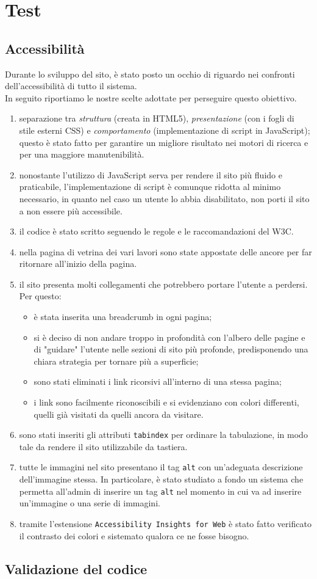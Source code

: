\section{Test}
\subsection{Accessibilità}
Durante lo sviluppo del sito, è stato posto un occhio di riguardo nei confronti dell'accessibilità di tutto il sistema.\\In seguito riportiamo le nostre scelte adottate per perseguire questo obiettivo.
\begin{enumerate}
	\item separazione tra \textit{struttura} (creata in HTML5), \textit{presentazione} (con i fogli di stile esterni CSS) e \textit{comportamento} (implementazione di script in JavaScript); \\questo è stato fatto per garantire un migliore risultato nei motori di ricerca e per una maggiore manutenibilità.
	
	\item nonostante l'utilizzo di JavaScript serva per rendere il sito più fluido e praticabile, l'implementazione di script è comunque ridotta al minimo necessario, in quanto nel caso un utente lo abbia disabilitato, non porti il sito a non essere più accessibile.
	\item il codice è stato scritto seguendo le regole e le raccomandazioni del W3C.
	\item nella pagina di vetrina dei vari lavori sono state appostate delle ancore per far ritornare all'inizio della pagina.
	\item il sito presenta molti collegamenti che potrebbero portare l'utente a perdersi. Per questo: 
	\begin{itemize}
	\item è stata inserita una breadcrumb in ogni pagina;
	\item si è deciso di non andare troppo in profondità con l'albero delle pagine e di "guidare" l'utente nelle sezioni di sito più profonde, predisponendo una chiara strategia per tornare più a superficie;
	\item sono stati eliminati i link ricorsivi all'interno di una stessa pagina;
	\item i link sono facilmente riconoscibili e si evidenziano con colori differenti, quelli già visitati da quelli ancora da visitare.
	\end{itemize}	
	\item sono stati inseriti gli attributi \texttt{tabindex} per ordinare la tabulazione, in modo tale da rendere il sito utilizzabile da tastiera.
	\item tutte le immagini nel sito presentano il tag \texttt{alt} con un'adeguata descrizione dell'immagine stessa. In particolare, è stato studiato a fondo un sistema che permetta all'admin di inserire un tag \texttt{alt} nel momento in cui va ad inserire un'immagine o una serie di immagini.
	\item tramite l'estensione \texttt{Accessibility Insights for Web} è stato fatto verificato il contrasto dei colori e sistemato qualora ce ne fosse bisogno.
\end{enumerate}
\subsection{Validazione del codice}